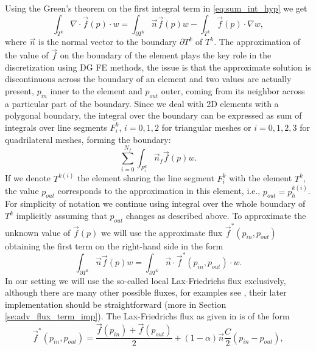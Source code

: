 Using the Green's theorem on the first integral term in \eqref{eq:sum_int_hyp} we
get
\begin{equation}
\label{eq:hyp_term}
\int_{T^k} \nabla\cdot \vec{f}(p)\cdot w = %
\int_{\partial{T^k}} \vec{n}\vec{f}(p)w - \int_{T^k} \vec{f}(p)\cdot\nabla w,
\end{equation}
where $\vec{n}$ is the normal vector to the boundary $\partial T^k$ of $T^k$.
The approximation of the value of $\vec{f}$ on the boundary of the
element plays the key role in the discretization using DG FE methods, the issue is
that the approximate solution is discontinuous across the boundary of an
element and two values are actually present, $p_{in}$ inner to the element and
$p_{out}$ outer, coming from its neighbor across a particular part of the
boundary. Since we deal with 2D
elements with a polygonal boundary, the integral over the boundary can be expressed as sum
of integrals over line segments ${F^k_i}$, $i=0,1,2$ for triangular meshes or
$i=0,1,2,3$ for quadrilateral meshes, forming the boundary:
\begin{equation}
\label{eq:hyp_int_facets}
\sum_{i=0}^{N_f} \int_{F^k_i} \vec{n}_f\vec{f}(p)w.
\end{equation}
If we denote $T^{k(i)}$ the element sharing the line segment $F^k_i$ with the
element $T^k$, the
value $p_{out}$ corresponds to the approximation in this element, i.e., $p_{out} =
p^{k(i)}_h$. For simplicity of notation we continue using integral over the whole
boundary of $T^k$ implicitly assuming that $p_{out}$ changes as described above. To
approximate the unknown value of $\vec{f}(p)$  we will use the approximate flux 
$\vec{f}^*(p_{in},
p_{out})$ obtaining the first term on the right-hand side in the form
\begin{equation}
\label{eq:flux_integral}
\int_{\partial{T^k}} \vec{n}\vec{f}(p)w = \int_{\partial{T^k}} \vec{n}
\cdot \vec{f}^{*} (p_{in}, p_{out})\cdot w.
\end{equation}
In our setting we will use the so-called local Lax-Friedrichs flux
exclusively, although there are many other possible fluxes, for examples see
\cite{Kucera, Cockburn2001a}, their later implementation should be straightforward (more
in Section \ref{se:adv_flux_term_imp}). The Lax-Friedrichs flux as given in
\cite{Hesthaven2008}
is of the form
\begin{equation}
\label{eq:lax-frieflux}
\vec{f}^{*}(p_{in}, p_{out}) =   \frac{\vec{f}(p_{in}) + \vec{f}(p_{out})}{2}  + 
(1-\alpha)
\vec{n}\frac{C}{2}(p_{in} -
p_{out}),
\end{equation}
